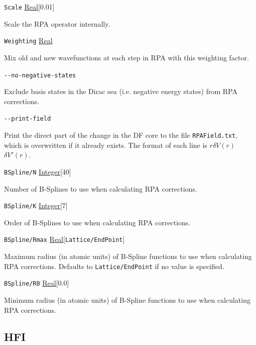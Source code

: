 \documentclass{report}
\begin{document}
\texttt{Scale} \uline{Real}[0.01]
\begin{adjustwidth}{1cm}{}
Scale the RPA operator internally.
\end{adjustwidth}

\texttt{Weighting} \uline{Real}
\begin{adjustwidth}{1cm}{}
Mix old and new wavefunctions at each step in RPA with this weighting factor.
\end{adjustwidth}

\texttt{{-}{-}no-negative-states}
\begin{adjustwidth}{1cm}{}
Exclude basis states in the Dirac sea (i.e. negative energy states) from RPA corrections.
\end{adjustwidth}

\texttt{{-}{-}print-field}
\begin{adjustwidth}{1cm}{}
Print the direct part of the change in the DF core to the file \texttt{RPAField.txt},
which is overwritten if it already exists. The format of each line is
\quad $r$\quad $\delta V(r)$\quad $\delta V'(r)$.
\end{adjustwidth}

\texttt{BSpline/N} \uline{Integer}[40]
\begin{adjustwidth}{1cm}{}
Number of B-Splines to use when calculating RPA corrections.
\end{adjustwidth}

\texttt{BSpline/K} \uline{Integer}[7]
\begin{adjustwidth}{1cm}{}
Order of B-Splines to use when calculating RPA corrections.
\end{adjustwidth}

\texttt{BSpline/Rmax} \uline{Real}[\texttt{Lattice/EndPoint}]
\begin{adjustwidth}{1cm}{}
Maximum radius (in atomic units) of B-Spline functions to use when calculating RPA corrections. 
Defaults to \texttt{Lattice/EndPoint} if no value is specified.
\end{adjustwidth}

\texttt{BSpline/R0} \uline{Real}[0.0]
\begin{adjustwidth}{1cm}{}
Minimum radius (in atomic units) of B-Spline functions to use when calculating RPA corrections.
\end{adjustwidth}

\subsection{HFI}
\label{sec:HFI}
\end{document}
